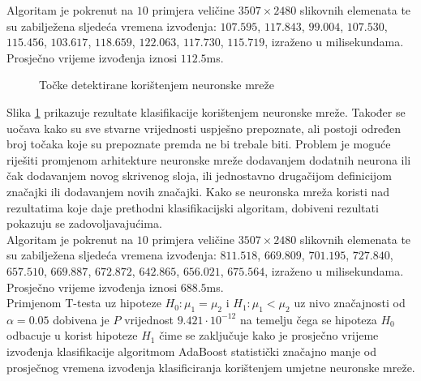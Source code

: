 \documentclass[times, utf8, zavrsni, numeric]{fer}
\begin{document}
Algoritam je pokrenut na $10$ primjera veličine $3507\times2480$ slikovnih elemenata te su zabilježena sljedeća vremena izvođenja: $107.595$, $117.843$, $99.004$, $107.530$, $115.456$, $103.617$, $118.659$, $122.063$, $117.730$, $115.719$, izraženo u milisekundama. 
Prosječno vrijeme izvođenja iznosi $112.5$ms.

\begin{figure}[!ht]
    \centering
    \captionsetup{justification=centering}
    \caption{Točke detektirane korištenjem neuronske mreže}
    \label{fig:neuralResult}
\end{figure}

Slika \ref{fig:neuralResult} prikazuje rezultate klasifikacije korištenjem neuronske mreže. 
Također se uočava kako su sve stvarne vrijednosti uspješno prepoznate, ali postoji određen broj točaka koje su prepoznate premda ne bi trebale biti. 
Problem je moguće riješiti promjenom arhitekture neuronske mreže dodavanjem dodatnih neurona ili čak dodavanjem novog skrivenog sloja, ili jednostavno drugačijom definicijom značajki ili dodavanjem novih značajki.
Kako se neuronska mreža koristi nad rezultatima koje daje prethodni klasifikacijski algoritam, dobiveni rezultati pokazuju se zadovoljavajućima.\\

Algoritam je pokrenut na $10$ primjera veličine $3507\times2480$ slikovnih elemenata te su zabilježena sljedeća vremena izvođenja: $811.518$, $669.809$, $701.195$, $727.840$, $657.510$, $669.887$, $672.872$, $642.865$, $656.021$, $675.564$, izraženo u milisekundama. 
Prosječno vrijeme izvođenja iznosi $688.5$ms.\\

Primjenom T-testa uz hipoteze $H_0: \mu_1 = \mu_2$ i $H_1: \mu_1 < \mu_2$ uz nivo značajnosti od $\alpha = 0.05$ dobivena je $P$ vrijednost $9.421\cdot10^{-12}$ na temelju čega se hipoteza $H_0$ odbacuje u korist hipoteze $H_1$ čime se zaključuje kako je prosječno vrijeme izvođenja klasifikacije algoritmom AdaBoost statistički značajno manje od prosječnog vremena izvođenja klasificiranja korištenjem umjetne neuronske mreže.
\end{document}
